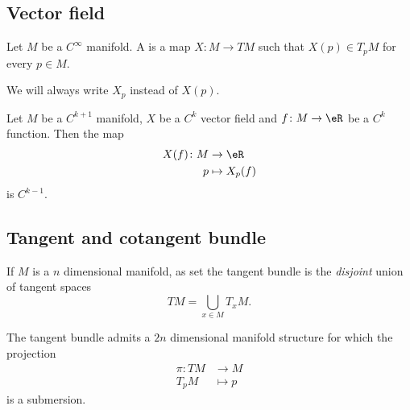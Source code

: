\subsection{Vector field}

\begin{definition}        \label{DEFooAATTooLhNqDb}
    Let \( M\) be a \(  C^{\infty}\) manifold. A  is a map \( X\colon M\to TM\) such that \( X(p)\in T_pM\) for every \( p\in M\).

    We will always write \( X_p\) instead of \( X(p)\).
\end{definition}

\begin{proposition}
    Let \( M\) be a \( C^{k+1}\) manifold, \( X\) be a \( C^k\) vector field and \( f\colon M \to \eR\) be a \( C^k\) function. Then the map
    \begin{equation}
        \begin{aligned}
            X(f)\colon M&\to \eR \\
            p&\mapsto X_p(f) 
        \end{aligned}
    \end{equation}
    is \( C^{k-1}\).
\end{proposition}


\subsection{Tangent and cotangent bundle}

If $M$ is a $n$ dimensional manifold, as set the tangent bundle is the \emph{disjoint} union of tangent spaces
\[
  TM=\bigcup_{x\in M}T_xM.
\]

\begin{theorem}
	The tangent bundle admits a $2n$ dimensional manifold structure for which the projection
	\begin{equation}
		\begin{aligned}
			\pi \colon TM &\to M\\
			T_pM&\mapsto p
		\end{aligned}
	\end{equation}
	is a submersion.
\end{theorem}

